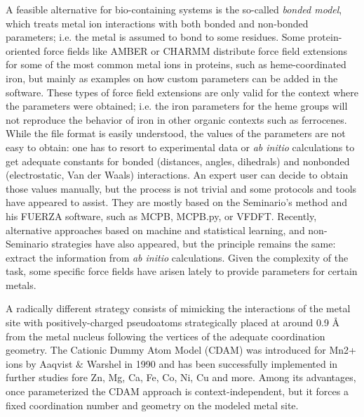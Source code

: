 A feasible alternative for bio-containing systems is the so-called \textit{bonded model}, which treats metal ion interactions with both bonded and non-bonded parameters; i.e. the metal is assumed to bond to some residues. Some protein-oriented force fields like AMBER\cite{amber} or CHARMM\cite{brooks1983} distribute force field extensions for some of the most common metal ions in proteins, such as heme-coordinated iron, but mainly as examples on how custom parameters can be added in the software. These types of force field extensions are only valid for the context where the parameters were obtained; i.e. the iron parameters for the heme groups will not reproduce the behavior of iron in other organic contexts such as ferrocenes. While the file format is easily understood, the values of the parameters are not easy to obtain: one has to resort to experimental data or \textit{ab initio} calculations to get adequate constants for bonded (distances, angles, dihedrals) and nonbonded (electrostatic, Van der Waals) interactions. An expert user can decide to obtain those values manually, but the process is not trivial and some protocols and tools have appeared to assist. They are mostly based on the Seminario's method and his FUERZA software,\cite{Seminario1996} such as MCPB, MCPB.py,\cite{Li2016} or VFDFT.\cite{zheng2016} Recently, alternative approaches based on machine and statistical learning, \cite{fracchia2017,li2017b} and non-Seminario strategies\cite{Burger2012, allen2017} have also appeared, but the principle remains the same: extract the information from \textit{ab initio} calculations. Given the complexity of the task, some specific force fields have arisen lately to provide parameters for certain metals.\cite{Huey_2007,Bureekaew_2013,Addicoat_2014,Landis_2007,Shi_2003,Rappe_1993,Nielson_2005}

A radically different strategy consists of mimicking the interactions of the metal site with positively-charged pseudoatoms strategically placed at around 0.9 \AA ~ from the metal nucleus following the vertices of the adequate coordination geometry. The Cationic Dummy Atom Model (CDAM) was introduced for Mn2+ ions by Aaqvist $\&$  Warshel in 1990\cite{aaqvist1990} and has been successfully implemented in further studies fore Zn, Mg, Ca, Fe, Co, Ni, Cu and more.\cite{duarte2014,lu2012proteins,Oelschlaeger_2007,Saxena_2013,Saxena_2014,Liao_2015,Pang_1999} Among its advantages, once parameterized the CDAM approach is context-independent, but it forces a fixed coordination number and geometry on the modeled metal site.

